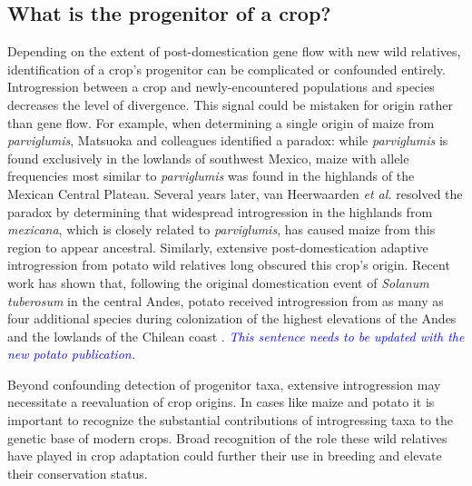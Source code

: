 \documentclass[11pt]{article}
\newcommand{\gmj}[1]{\textcolor{blue}{ \emph{\scriptsize  #1}} } %
\begin{document}
\subsection*{What is the progenitor of a crop?}
Depending on the extent of post-domestication gene flow with new wild relatives, identification of a crop's progenitor can be complicated or confounded entirely.
Introgression between a crop and newly-encountered populations and species decreases the level of divergence.
This signal could be mistaken for origin rather than gene flow.
For example, when determining a single origin of maize from \emph{parviglumis}, Matsuoka and colleagues \cite{matsuoka2002single} identified a paradox: while \emph{parviglumis} is found exclusively in the lowlands of southwest Mexico, maize with allele frequencies most similar to \emph{parviglumis} was found in the highlands of the Mexican Central Plateau.
Several years later, van Heerwaarden \emph{et al.} \cite{vanHeerwaarden2011} resolved the paradox by determining that widespread introgression in the highlands from \emph{mexicana}, which is closely related to \emph{parviglumis}, has caused maize from this region to appear ancestral.
Similarly, extensive post-domestication adaptive introgression from  potato wild relatives long obscured this crop's origin.
Recent work has shown that, following the original domestication event of \emph{Solanum tuberosum} in the central Andes, potato received introgression from as many as four additional species during colonization of the highest elevations of the Andes and the lowlands of the Chilean coast \cite{Spooner2014, Gavrilenko2013}. \gmj{This sentence  needs to be updated with the new potato publication.}

Beyond confounding detection of progenitor taxa, extensive introgression may necessitate a reevaluation of crop origins.
In cases like maize and potato it is important to recognize the substantial contributions of introgressing taxa to the genetic base of modern crops.
Broad recognition of the role these wild relatives have played in crop adaptation could further their use in breeding and elevate their conservation status.
\end{document}
